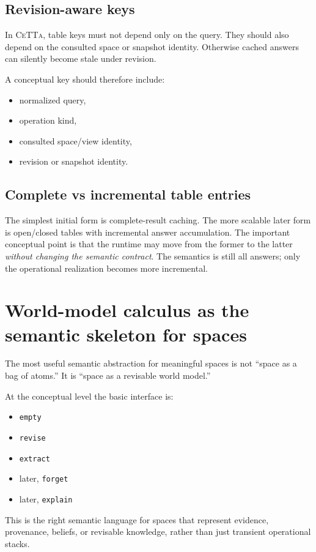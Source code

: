 \documentclass[11pt]{article}
\newcommand{\CeTTa}{\textsc{CeTTa}}
\begin{document}
\subsection{Revision-aware keys}
In \CeTTa, table keys must not depend only on the query. They should also depend on the consulted space or snapshot identity. Otherwise cached answers can silently become stale under revision.

A conceptual key should therefore include:
\begin{itemize}
    \item normalized query,
    \item operation kind,
    \item consulted space/view identity,
    \item revision or snapshot identity.
\end{itemize}

\subsection{Complete vs incremental table entries}
The simplest initial form is complete-result caching. The more scalable later form is open/closed tables with incremental answer accumulation. The important conceptual point is that the runtime may move from the former to the latter \emph{without changing the semantic contract}. The semantics is still all answers; only the operational realization becomes more incremental.

\section{World-model calculus as the semantic skeleton for spaces}
The most useful semantic abstraction for meaningful spaces is not ``space as a bag of atoms.'' It is ``space as a revisable world model.''

At the conceptual level the basic interface is:
\begin{itemize}
    \item \texttt{empty}
    \item \texttt{revise}
    \item \texttt{extract}
    \item later, \texttt{forget}
    \item later, \texttt{explain}
\end{itemize}

This is the right semantic language for spaces that represent evidence, provenance, beliefs, or revisable knowledge, rather than just transient operational stacks.
\end{document}
